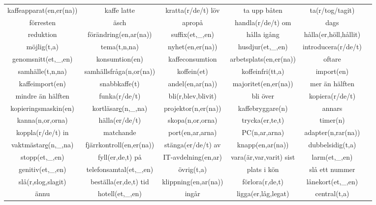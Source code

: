 
\begin{center}
    \begin{adjustwidth}{-2.4cm}{}
        \begin{tabular}{|c c c c c c|}
            \hline
            kaffeapparat(en,er(na)) & kaffe latte & kratta(r/de/t) löv & ta upp båten & ta(r/tog/tagit) &  \\
            förresten & äsch & apropå & handla(r/de/t) om & dags &  \\
            reduktion & förändring(en,ar(na)) & suffix(et,\_,en) & hålla igång & hålla(er,höll,hållit) &  \\
            möjlig(t,a) & tema(t,n,na) & nyhet(en,er(na)) & husdjur(et,\_,en) & introducera(r/de/t) &  \\
            genomsnitt(et,\_,en) & konsumtion(en) & kaffeconsumtion & arbetsplats(en,er(na)) & oftare &  \\
            samhälle(t,n,na) & samhällsfråga(n,or(na)) & koffein(et) & koffeinfri(tt,a) & import(en) &  \\
            kaffeimport(en) & snabbkaffe(t) & andel(en,ar(na)) & majoritet(en,er(na)) & mer än hälften &  \\
            mindre än hälften & funka(r/de/t) & bli(r,blev,blivit) & bli över & kopiera(r/de/t) &  \\
            kopieringsmaskin(en) & kortläsar\underline{e}(n,\_,na) & projektor(n,er(na)) & kaffebryggare(n) & annars &  \\
            kanna(n,or,orna) & hälla(er/de/t) & skopa(n,or,orna) & trycka(er,te,t) & timer(n) &  \\
            koppla(r/de/t) in & matchande & port(en,ar,arna) & PC(n,ar,arna) & adapter(n,rar(na)) &  \\
            vaktmästar\underline{e}(n,\_,na) & fjärrkontroll(en,er(na)) & stänga(er/de/t) av & knapp(en,ar(na)) & dubbelsidig(t,a) &  \\
            stopp(et,\_,en) & fyll(er,de,t) på & IT-avdelning(en,ar) & vara(är,var,varit) sist & larm(et,\_,en) &  \\
            genitiv(et,\_,en) & telefonsamtal(et,\_,en) & övrig(t,a) & plats i kön & slå ett nummer &  \\
            slå(r,slog,slagit) & beställa(er,de,t) tid & klippning(en,ar(na)) & förlora(r,de,t) & lånekort(et,\_,en) &  \\
            ännu & hotell(et,\_,en) & ingår & ligga(er,låg,legat) & central(t,a) &  \\

\end{tabular}
\end{adjustwidth}
\end{center}
